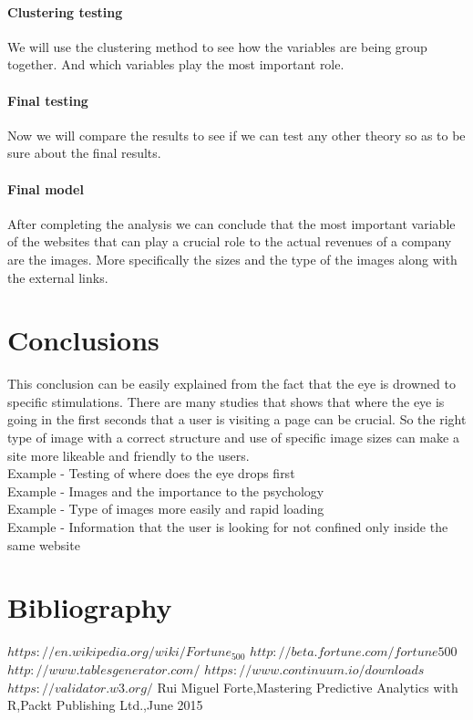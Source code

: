 \documentclass{article}
\begin{document}
\paragraph{Clustering testing}
We will use the clustering method to see how the variables are being group together. And which variables play the most important role.
\paragraph{Final testing}
Now we will compare the results to see if we can test any other theory so as to be sure about the final results.
\paragraph{Final model}
After completing the analysis we can conclude that the most important variable of the websites that can play a crucial role to the actual revenues of a company are the images. More specifically the sizes and the type of the images along with the external links.
\pagebreak  
\section{Conclusions}
This conclusion can be easily explained from the fact that the eye is drowned to specific stimulations. There are many studies that shows that where the eye is going in the first seconds that a user is visiting a page can be crucial. So the right type of image with a correct structure and use of specific image sizes can make a site more likeable and friendly to the users.\\
Example - Testing of where does the eye drops first\\
Example - Images and the importance to the psychology\\
Example - Type of images more easily and rapid loading\\
Example - Information that the user is looking for not confined only inside the same website\\
\pagebreak  
\section{Bibliography}
\begin{thebibliography}{widest-label}

$https://en.wikipedia.org/wiki/Fortune_500$
$http://beta.fortune.com/fortune500$
$http://www.tablesgenerator.com/$
$https://www.continuum.io/downloads$
$https://validator.w3.org/$
Rui Miguel Forte,Mastering Predictive Analytics with R,Packt Publishing Ltd.,June 2015


\end{thebibliography}
\end{document}
